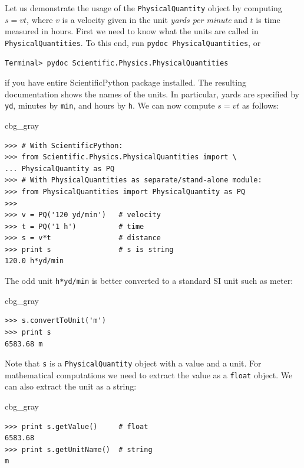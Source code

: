 \documentclass[graybox,envcountchap,sectrefs,final]{svmonodo}
\newenvironment{_cod_tight}[1]{
   \def\FrameCommand{\colorbox{#1}}
   \FrameRule0.6pt\MakeFramed {\FrameRestore}\vskip3mm}
   {\vskip0mm\endMakeFramed}
\newenvironment{cod}[1]{
\bgroup\rmfamily
\fboxsep=0mm\relax
\begin{_cod_tight}{#1}
\list{}{\parsep=-2mm\parskip=0mm\topsep=0pt\leftmargin=2mm
\rightmargin=2\leftmargin\leftmargin=4pt\relax}
\item\relax}
{\endlist\end{_cod_tight}\egroup}
\begin{document}
Let us demonstrate the usage of the \texttt{PhysicalQuantity} object by
computing $s=vt$, where $v$ is a velocity given in the unit \emph{yards per
minute} and $t$ is time measured in hours.  First we need to know what
the units are called in \texttt{PhysicalQuantities}.  To this end, run \texttt{pydoc PhysicalQuantities}, or

\begin{Verbatim}[frame=lines,label=\fbox{{\tiny Terminal}},framesep=2.5mm,framerule=0.7pt,fontsize=\fontsize{9pt}{9pt}]
Terminal> pydoc Scientific.Physics.PhysicalQuantities
\end{Verbatim}
if you have entire ScientificPython package installed. The
resulting documentation shows the names of
the units. In particular,
yards are specified by \texttt{yd}, minutes by \texttt{min}, and hours
by \texttt{h}. We can now compute $s=vt$ as follows:

\begin{cod}{cbg_gray}\begin{Verbatim}[numbers=none,fontsize=\fontsize{9pt}{9pt},baselinestretch=0.95,xleftmargin=2mm]
>>> # With ScientificPython:
>>> from Scientific.Physics.PhysicalQuantities import \ 
... PhysicalQuantity as PQ
>>> # With PhysicalQuantities as separate/stand-alone module:
>>> from PhysicalQuantities import PhysicalQuantity as PQ
>>>
>>> v = PQ('120 yd/min')   # velocity
>>> t = PQ('1 h')          # time
>>> s = v*t                # distance
>>> print s                # s is string
120.0 h*yd/min
\end{Verbatim}
\end{cod}
\noindent
The odd unit \texttt{h*yd/min} is better converted to a standard SI unit such
as meter:

\begin{cod}{cbg_gray}\begin{Verbatim}[numbers=none,fontsize=\fontsize{9pt}{9pt},baselinestretch=0.95,xleftmargin=2mm]
>>> s.convertToUnit('m')
>>> print s
6583.68 m
\end{Verbatim}
\end{cod}
\noindent
Note that \texttt{s} is a \texttt{PhysicalQuantity} object with a value and a
unit. For mathematical computations we need to extract the
value as a \texttt{float} object. We can also extract the unit as a string:

\begin{cod}{cbg_gray}\begin{Verbatim}[numbers=none,fontsize=\fontsize{9pt}{9pt},baselinestretch=0.95,xleftmargin=2mm]
>>> print s.getValue()     # float
6583.68
>>> print s.getUnitName()  # string
m
\end{Verbatim}
\end{cod}
\noindent
\end{document}
